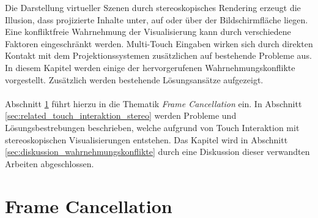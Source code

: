 Die Darstellung virtueller Szenen durch stereoskopisches Rendering erzeugt die Illusion, dass projizierte Inhalte unter, auf oder über der Bildschirmfläche liegen. Eine konfliktfreie Wahrnehmung der Visualisierung kann durch verschiedene Faktoren eingeschränkt werden. Multi-Touch Eingaben wirken sich durch direkten Kontakt mit dem Projektionssystemen zusätzlichen auf bestehende Probleme aus. In diesem Kapitel werden einige der hervorgerufenen Wahrnehmungskonflikte vorgestellt. Zusätzlich werden bestehende Lösungsansätze aufgezeigt.
\\\\
Abschnitt \ref{sec:related_frame_cancellation} führt hierzu in die Thematik \emph{Frame Cancellation} ein. In Abschnitt \ref{sec:related_touch_interaktion_stereo} werden Probleme und Lösungsbestrebungen beschrieben, welche aufgrund von Touch Interaktion mit stereoskopischen Visualisierungen entstehen. Das Kapitel wird in Abschnitt \ref{sec:diskussion_wahrnehmungskonflikte} durch eine Diskussion dieser verwandten Arbeiten abgeschlossen.


\section{Frame Cancellation}
\label{sec:related_frame_cancellation}

